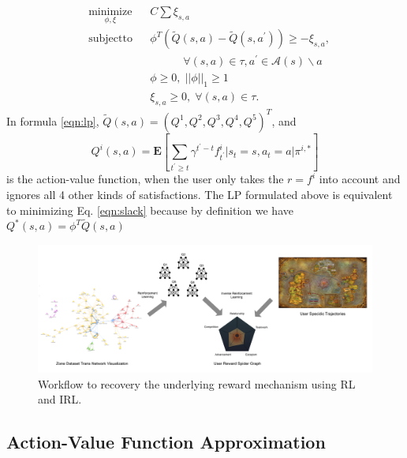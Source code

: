 \documentclass{sigchi}
\begin{document}
\begin{equation}
\begin{aligned}
& \underset{\phi, \xi}{\mathrm{minimize}}
& & C\sum \xi_{s,a} \\
& \mathrm{subject to}
& & \phi^T(\tilde{Q}(s,a)-\tilde{Q}(s,a^\prime)) \geq - \xi_{s,a}, \\
&&& \quad\quad\quad \forall (s,a) \in \tau, a^\prime \in \mathcal{A}(s)\backslash a \\
&&& \phi \geq 0, \; ||\phi||_1\geq 1\\
&&& \xi_{s,a} \geq 0, \; \forall (s,a) \in \tau. 
\label{eqn:lp}
\end{aligned}
\end{equation}
In formula \eqref{eqn:lp}, $\tilde{Q}(s,a)=(Q^1,Q^2,Q^3,Q^4,Q^5)^T$, and
\begin{equation}
Q^i(s,a)=\mathbf{E}[\sum_{t^\prime\geq t}\gamma^{t^\prime-t}f^i_{t^\prime} | s_{t}=s, a_{t}=a | \pi^{i,\ast}] \label{eqn:qi}
\end{equation}
is the action-value function, when the user only takes the $r=f^i$ into account and ignores all 4 other kinds of satisfactions.
The LP formulated above is equivalent to minimizing Eq. \eqref{eqn:slack} because by definition we have $Q^*(s,a)=\phi^T\tilde{Q}(s,a)$

\begin{figure}[t]
  \centering
  \includegraphics[width=\textwidth]{figs/workflow.png}
  \caption{Workflow to recovery the underlying reward mechanism using RL and IRL.}
  \label{fig:workflow}
\end{figure}

\subsection{Action-Value Function Approximation}
\end{document}

